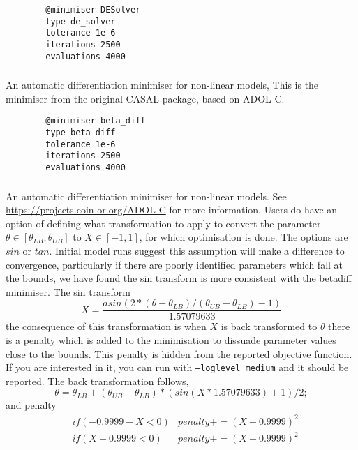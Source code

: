{\small{\begin{verbatim}
		@minimiser DESolver
		type de_solver
		tolerance 1e-6
		iterations 2500
		evaluations 4000
\end{verbatim}}}

\subsubsection{}\label{sec:Minimiser-BetaDiff}

An automatic differentiation minimiser for non-linear models, This is the minimiser from the original CASAL package, based on ADOL-C.

{\small{\begin{verbatim}
		@minimiser beta_diff
		type beta_diff
		tolerance 1e-6
		iterations 2500
		evaluations 4000
\end{verbatim}}}

\subsubsection{}\label{sec:Minimiser-ADOLC}

An automatic differentiation minimiser for non-linear models. See \url{https://projects.coin-or.org/ADOL-C} for more information. Users do have an option of defining what transformation to apply to convert the parameter \(\theta \in [\theta_{LB}, \theta_{UB}]\) to \(X \in [-1, 1]\), for which optimisation is done. The options are $sin$ or $tan$. Initial model runs suggest this assumption will make a difference to convergence, particularly if there are poorly identified parameters which fall at the bounds, we have found the sin transform is more consistent with the betadiff minimiser. The sin transform
\begin{equation}
	X = \frac{asin(2 * (\theta - \theta_{LB}) / (\theta_{UB} - \theta_{LB}) - 1)}{ 1.57079633}
\end{equation}
%
the consequence of this transformation is when \(X\) is back transformed to \(\theta\) there is a penalty which is added to the minimisation to dissuade parameter values close to the bounds. This penalty is hidden from the reported objective function. If you are interested in it, you can run with \texttt{--loglevel medium} and it should be reported. The back transformation follows,
\begin{equation}
\theta = \theta_{LB} + (\theta_{UB} - \theta_{LB}) * (sin(X * 1.57079633) + 1) / 2;
\end{equation}
%
and penalty
\begin{align}
	&if(-0.9999 - X < 0) & penalty += (X + 0.9999)^2\\
	&if(X - 0.9999 < 0) & penalty += (X - 0.9999)^2
\end{align}
%

